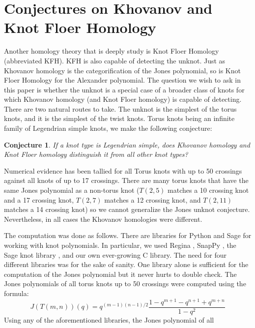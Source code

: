 \documentclass{article}
\theoremstyle{plain}
\newtheorem{conjecture}{Conjecture}
\begin{document}
	\section{Conjectures on Khovanov and Knot Floer Homology}
	    Another homology theory that is deeply study is Knot Floer Homology
	    (abbreviated KFH). KFH is also capable of detecting the unknot. Just as
	    Khovanov homology is the categorification of the Jones polynomial, so
	    is Knot Floer Homology for the Alexander polynomial.
	    The question we wish to ask in this paper is whether the unknot is
	    a special case of a broader class of knots for which Khovanov homology
	    (and Knot Floer homology) is capable of detecting. There are two
	    natural routes to take. The unknot is the simplest of the torus knots,
	    and it is the simplest of the twist knots. Torus knots being an
	    infinite family of Legendrian simple knots, we make the following
	    conjecture:
	    \begin{conjecture}
	        If a knot type is Legendrian simple, does Khovanov homology and
	        Knot Floer homology distinguish it from all other knot types?
	    \end{conjecture}
	    Numerical evidence has been tallied for all Torus knots with up to 50
	    crossings against all knots of up to 17 crossings. There are many
	    torus knots that have the same Jones polynomial as a non-torus knot
	    ($T(2,5)$ matches a 10 crossing knot and a 17 crossing knot, $T(2,7)$
	    matches a 12 crossing knot, and $T(2,11)$ matches a 14 crossing knot)
	    so we cannot generalize the Jones unknot conjecture. Nevertheless, in
	    all cases the Khovanov homologies were different.
	    \par\hfill\par
	    The computation was done as follows. There are libraries for Python and
	    Sage for working with knot polynomials. In particular, we used
	    Regina \cite{regina}, SnapPy \cite{SnapPy}, the Sage knot library
	    \cite{sage}, and our own ever-growing C library. The need for four
	    different libraries was for the sake of sanity. One library alone is
	    sufficient for the computation of the Jones polynomial but it never
	    hurts to double check. The Jones polynomials of all torus knots up to
	    50 crossings were computed using the formula:
	    \begin{equation}
	        J(T(m,n))(q)=q^{(m-1)(n-1)/2}
	            \frac{1-q^{m+1}-q^{n+1}+q^{m+n}}{1-q^{2}}
	    \end{equation}
	    Using any of the aforementioned libraries, the Jones polynomial of all
\end{document}
